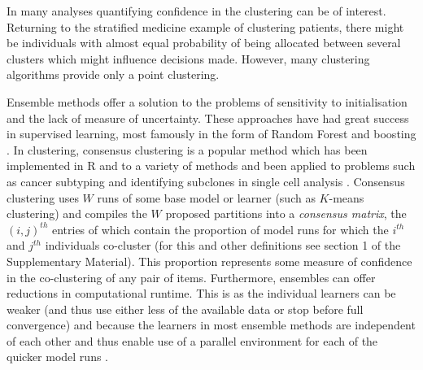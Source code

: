 \documentclass[12pt]{article}
\begin{document}
In many analyses
quantifying confidence in the clustering can be of interest. Returning to the stratified medicine example of clustering patients, there might be individuals with almost equal probability of being allocated between several clusters which might influence decisions made.
However, many clustering algorithms provide only a point clustering.

Ensemble methods offer a solution to the problems of sensitivity to initialisation and the lack of measure of uncertainty. These approaches have had great success in supervised learning, most famously in the form of Random Forest \citep{breiman2001random} and boosting \citep{friedman2002stochastic}. In clustering, consensus clustering \citep{monti2003consensus} is a popular method which has been implemented in R \citep{wilkerson2010consensusclusterplus} and to a variety of methods \citep{john2020m3c, gu2020cola} and been applied to problems such as cancer subtyping \citep{lehmann2011identification, verhaak2010integrated} and identifying subclones in single cell analysis \citep{kiselev2017sc3}. Consensus clustering uses $W$ runs of some base model or learner (such as $K$-means clustering) and compiles the $W$ proposed partitions into a \emph{consensus matrix}, the $(i, j)^{th}$ entries of which contain the proportion of model runs for which the $i^{th}$ and $j^{th}$ individuals co-cluster (for this and other definitions see section 1 of the Supplementary Material). This proportion represents some measure of confidence in the co-clustering of any pair of items. Furthermore, ensembles can offer reductions in computational runtime. This is as the individual learners can be weaker (and thus use either less of the available data or stop before full convergence) and because the learners in most ensemble methods are independent of each other and thus enable use of a parallel environment for each of the quicker model runs \citep{ghaemi2009survey}. 
\end{document}
